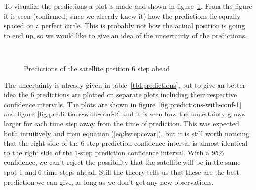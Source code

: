 To visualize the predictions a plot is made and shown in figure~\ref{fig:all-predictions}. From the figure it is seen (confirmed, since we already knew it) how the predictions lie equally spaced on a perfect circle. This is probably not how the actual position is going to end up, so we would like to give an idea of the uncertainty of the predictions.

\begin{figure}[!ht]
    \centering
    \mbox{ \quad 
            }
    \caption{Predictions of the satellite position 6 step ahead}
    \label{fig:all-predictions}
\end{figure}

The uncertainty is already given in table~\ref{tbl:predictions}, but to give an better idea the 6 predictions are plotted on separate plots including their respective confidence intervals. The plots are shown in figure~\ref{fig:predictions-with-conf-1} and figure~\ref{fig:predictions-with-conf-2} and it is seen how the uncertainty grows larger for each time step away from the time of prediction. This was expected both intuitively and from equation (\ref{eq:kstepcovar}), but it is still worth noticing that the right side of the 6-step prediction confidence interval is almost identical to the right side of the 1-step prediction confidence interval. With a 95\% confidence, we can't reject the possibility that the satellite will be in the same spot 1 and 6 time steps ahead. Still the theory tells us that these are the best prediction we can give, as long as we don't get any new observations.


